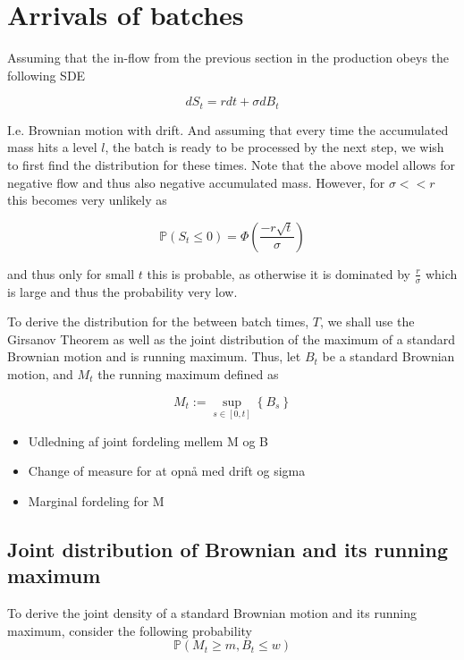 \documentclass[../Thesis.tex]{subfiles}
\begin{document}
\cite{Hoare78}

\cite{CK01}



\newpage
\section{Arrivals of batches}
Assuming that the in-flow from the previous section in the production obeys the following SDE

$$dS_t = r dt + \sigma dB_t$$

I.e. Brownian motion with drift. And assuming that every time the accumulated mass hits a level $l$, the batch is ready to be processed by the next step, we wish to first find the distribution for these times. Note that the above model allows for negative flow and thus also negative accumulated mass. However, for $\sigma << r$ this becomes very unlikely as

$$\mathbb{P} \left( S_t \leq 0\right) = \Phi \left( \frac{-r \sqrt{t}}{\sigma } \right)$$

and thus only for small $t$ this is probable, as otherwise it is dominated by $\frac{r}{\sigma}$ which is large and thus the probability very low.


To derive the distribution for the between batch times, $T$, we shall use the Girsanov Theorem as well as the joint distribution of the maximum of a standard Brownian motion and is running maximum. Thus, let $B_t$ be a standard Brownian motion, and $M_t$ the running maximum defined as

$$M_t := \sup_{s\in [0,t]} \left\{ B_s \right\}$$


\begin{itemize}
    \item Udledning af joint fordeling mellem M og B
    \item Change of measure for at opnå med drift og sigma
    \item Marginal fordeling for M
\end{itemize}





\subsection{Joint distribution of Brownian and its running maximum}
To derive the joint density of a standard Brownian motion and its running maximum, consider the following probability
$$\mathbb{P}\left(M_t \geq m, B_t \leq w\right)$$
\end{document}
